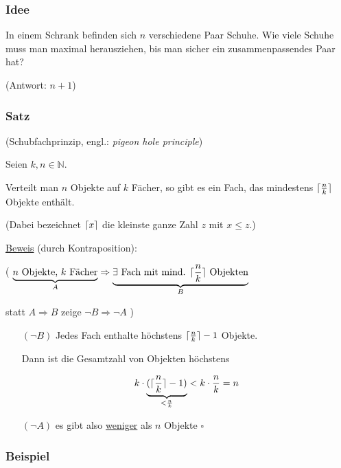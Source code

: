 \documentclass[a4paper, 12pt, twoside] {article}
\DeclarePairedDelimiter\ceil{\lceil}{\rceil}
\begin{document}
\subsubsection{Idee} In einem Schrank befinden sich $n$ verschiedene Paar Schuhe. Wie viele Schuhe muss man maximal herausziehen, bis man sicher ein zusammenpassendes Paar hat?

(Antwort: $n+1$)

\subsubsection{Satz} (Schubfachprinzip, engl.: {\it pigeon hole principle})

Seien $k,n \in \mathbb{N}$.

Verteilt man $n$ Objekte auf $k$ Fächer, so gibt es ein Fach, das mindestens $\ceil{\frac{n}{k}}$ Objekte enthält.

(Dabei bezeichnet $\ceil{x}$ die kleinste ganze Zahl $z$ mit $x \leq z$.)

\underline{Beweis} (durch Kontraposition):

( $\underbrace{n \text{ Objekte, } k \text{ Fächer}}_{A} \Rightarrow \underbrace{\exists \text{ Fach mit mind. } \ceil{\frac{n}{k}} \text{ Objekten}}_{B}$

statt $A \Rightarrow B$ zeige $\neg B \Rightarrow \neg A$ )

\begin{itemize}
\item[$(\neg B)$]
	Jedes Fach enthalte höchstens $\ceil{\frac{n}{k}}-1$ Objekte.
	
	Dann ist die Gesamtzahl von Objekten höchstens
	
	$$k \cdot \underbrace{(\ceil{\frac{n}{k}}-1)}_{< \frac{n}{k}} < k \cdot \frac{n}{k} = n$$

\item[$(\neg A)$]
	es gibt also \underline{weniger} als $n$ Objekte
	\hfill $\square$

\end{itemize}


\subsubsection{Beispiel}
\end{document}
